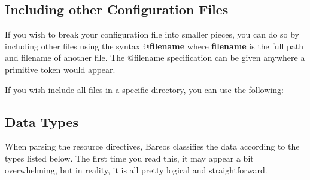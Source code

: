 \subsection{Including other Configuration Files}
\label{Includes}

If you wish to break your configuration file into smaller pieces, you can do
so by including other files using the syntax @{\bf filename} where {\bf
filename} is the full path and filename of another file. The @filename
specification can be given anywhere a primitive token would appear.

If you wish include all files in a specific directory, you can use the following:
\hide{$}



\subsection{Data Types}
\label{DataTypes}

When parsing the resource directives, Bareos classifies the data according to
the types listed below. The first time you read this, it may appear a bit
overwhelming, but in reality, it is all pretty logical and straightforward.

